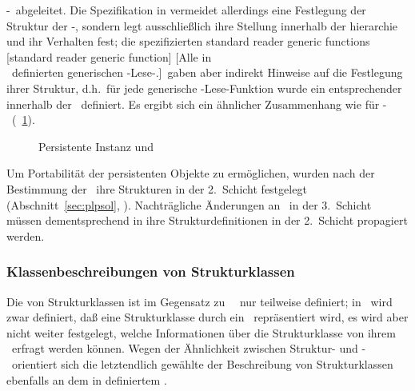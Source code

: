 \std-\mc[n]\ abgeleitet. Die Spezifikation in \cite{bib:amop91}
vermeidet allerdings eine Festlegung der
Struktur der \std-\mc[n], sondern legt ausschlie\ss{}lich ihre Stellung
innerhalb der \mc[n]hierarchie und ihr Verhalten fest; die
spezifizierten
%
{standard reader generic functions}%
%
[standard reader generic function]%
[{Alle in\protect\\%
\protect{}\ definierten
generischen \protect\Std-Lese-\protect\fn[en].}]\ gaben
aber indirekt Hinweise auf
die Festlegung ihrer Struktur, d.h.\ f\"{u}r jede generische
\std-Lese-Funktion wurde ein entsprechender \Slt\/ innerhalb der
\dec\ definiert.  Es ergibt sich ein \"{a}hn\-li\-cher Zusammenhang wie
f\"{u}r \std-\mc[n]\ (\figurename~\ref{fig:plicmc}).
%
\begin{figure}[hbtp]%
\ifbuch%
\centerline{}%
\else%
\centerline{}%
\fi%
\caption{Persistente Instanz und \protect\clsdo}%
\label{fig:plicmc}%
\end{figure}%
%
\par{} Um Portabilit\"{a}t der persistenten Objekte zu erm\"{o}glichen,
wurden nach der Bestimmung der \dec[n]\ ihre Strukturen in der
2.~Schicht festgelegt (Abschnitt~\ref{sec:plpsol},
\citepage{\pageref{sec:plpsol}}). Nachtr\"{a}gliche \"{A}nderungen an
\dec[n]\ in der 3.~Schicht m\"{u}ssen dementsprechend in ihre
Strukturdefinitionen in der 2.~Schicht propagiert werden.
%
\subsubsection{Klassenbeschreibungen von Strukturklassen}%
\label{sec:strdescr}%
%
Die \representation{} von Strukturklassen ist im
Gegensatz zu \clos\ \cls[n]\ nur teilweise definiert; in
\ wird zwar definiert, da\ss{} eine Strukturklasse durch
ein \clsmo\ repr\"{a}sentiert wird, es wird aber nicht weiter festgelegt,
welche Informationen \"{u}ber die Strukturklasse von ihrem \clsmo\ erfragt
werden k\"{o}n\-nen. Wegen der \"{A}hnlichkeit zwischen Struktur- und
\clos-\cls[n]\ orientiert sich die letztendlich gew\"{a}hlte
\representation{} der Beschreibung von Strukturklassen ebenfalls an dem
in \cite{bib:amop91} definiertem \std.
%
